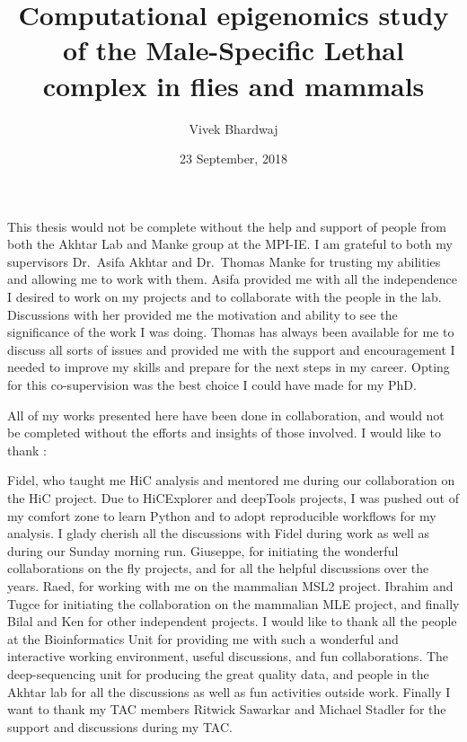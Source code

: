 \documentclass[11pt,twoside]{MPIthesis}
\title{Computational epigenomics study of the Male-Specific Lethal complex in
flies and mammals}
\author{Vivek Bhardwaj}
\date{23 September, 2018}
\theoremstyle{definition}
\theoremstyle{definition}
\theoremstyle{definition}
\theoremstyle{remark}
\begin{document}
  \maketitle

\makepagetwo

\frontmatter %
\pagestyle{empty} %
  \begin{acknowledgements}
    This thesis would not be complete without the help and support of people
    from both the Akhtar Lab and Manke group at the MPI-IE. I am grateful to
    both my supervisors Dr.~Asifa Akhtar and Dr.~Thomas Manke for trusting
    my abilities and allowing me to work with them. Asifa provided me with
    all the independence I desired to work on my projects and to collaborate
    with the people in the lab. Discussions with her provided me the
    motivation and ability to see the significance of the work I was doing.
    Thomas has always been available for me to discuss all sorts of issues
    and provided me with the support and encouragement I needed to improve
    my skills and prepare for the next steps in my career. Opting for this
    co-supervision was the best choice I could have made for my PhD.
    
    All of my works presented here have been done in collaboration, and
    would not be completed without the efforts and insights of those
    involved. I would like to thank :
    
    Fidel, who taught me HiC analysis and mentored me during our
    collaboration on the HiC project. Due to HiCExplorer and deepTools
    projects, I was pushed out of my comfort zone to learn Python and to
    adopt reproducible workflows for my analysis. I glady cherish all the
    discussions with Fidel during work as well as during our Sunday morning
    run. Giuseppe, for initiating the wonderful collaborations on the fly
    projects, and for all the helpful discussions over the years. Raed, for
    working with me on the mammalian MSL2 project. Ibrahim and Tugce for
    initiating the collaboration on the mammalian MLE project, and finally
    Bilal and Ken for other independent projects. I would like to thank all
    the people at the Bioinformatics Unit for providing me with such a
    wonderful and interactive working environment, useful discussions, and
    fun collaborations. The deep-sequencing unit for producing the great
    quality data, and people in the Akhtar lab for all the discussions as
    well as fun activities outside work. Finally I want to thank my TAC
    members Ritwick Sawarkar and Michael Stadler for the support and
    discussions during my TAC.
  \end{acknowledgements}
  \hypersetup{linkcolor=black}
  \setcounter{tocdepth}{2}
  \tableofcontents
\end{document}
